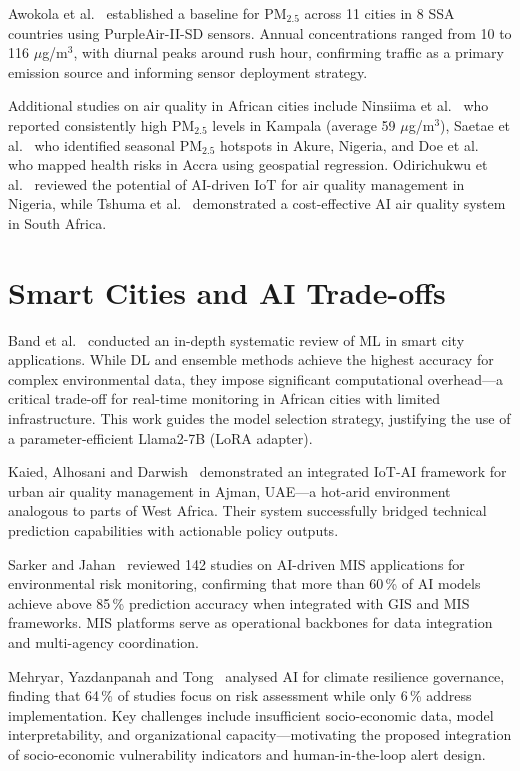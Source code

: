 \documentclass[12pt,a4paper]{report}
\begin{document}
Awokola et al.~\cite{awokola2022} established a baseline for PM$_{2.5}$ across 11 cities in 8 SSA countries using PurpleAir-II-SD sensors. Annual concentrations ranged from 10 to 116 $\mu$g/m$^3$, with diurnal peaks around rush hour, confirming traffic as a primary emission source and informing sensor deployment strategy.

Additional studies on air quality in African cities include Ninsiima et al.~\cite{Mackline_Ninsiima_2023} who reported consistently high PM$_{2.5}$ levels in Kampala (average 59 $\mu$g/m$^3$), Saetae et al.~\cite{Sawanya_Saetae_2024} who identified seasonal PM$_{2.5}$ hotspots in Akure, Nigeria, and Doe et al.~\cite{Eric_Kofi_Doe_2025} who mapped health risks in Accra using geospatial regression. Odirichukwu et al.~\cite{JC_Odirichukwu_2024} reviewed the potential of AI-driven IoT for air quality management in Nigeria, while Tshuma et al.~\cite{Methembe_Thomas_Tshuma_2024} demonstrated a cost-effective AI air quality system in South Africa.

\section{Smart Cities and AI Trade-offs}
Band et al.~\cite{band2022} conducted an in-depth systematic review of ML in smart city applications. While DL and ensemble methods achieve the highest accuracy for complex environmental data, they impose significant computational overhead—a critical trade-off for real-time monitoring in African cities with limited infrastructure. This work guides the model selection strategy, justifying the use of a parameter-efficient Llama2-7B (LoRA adapter).

Kaied, Alhosani and Darwish~\cite{kaied2025} demonstrated an integrated IoT-AI framework for urban air quality management in Ajman, UAE—a hot-arid environment analogous to parts of West Africa. Their system successfully bridged technical prediction capabilities with actionable policy outputs.

Sarker and Jahan~\cite{sarker2025} reviewed 142 studies on AI-driven MIS applications for environmental risk monitoring, confirming that more than 60\,\% of AI models achieve above 85\,\% prediction accuracy when integrated with GIS and MIS frameworks. MIS platforms serve as operational backbones for data integration and multi-agency coordination.

Mehryar, Yazdanpanah and Tong~\cite{mehryar2024} analysed AI for climate resilience governance, finding that 64\,\% of studies focus on risk assessment while only 6\,\% address implementation. Key challenges include insufficient socio-economic data, model interpretability, and organizational capacity—motivating the proposed integration of socio-economic vulnerability indicators and human-in-the-loop alert design.
\end{document}

